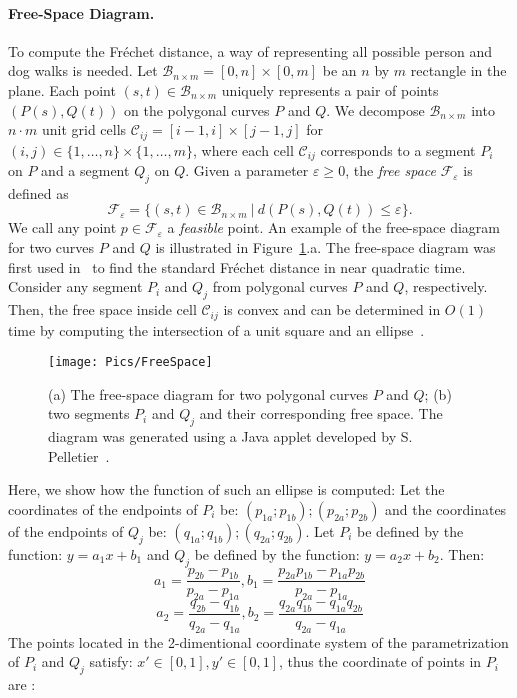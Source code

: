 \documentclass[12pt]{dalthesis}
\newcommand{\lee}{\leqslant}
\newcommand{\gee}{\geqslant}
\newcommand{\set}[1]{{\{ #1 \}}}
\newcommand{\eps}{\varepsilon}
\newcommand{\CF}{{\mathscr F}}
\newcommand{\CB}{{\mathscr B}}
\newcommand{\CC}{{\mathscr C}}
\newcommand{\Frechet}{Fr\'echet }
\newcommand{\cell}[1]{{\CC_{#1}}}
\newcommand{\BNM}{\CB_{n \times m}}
\newcommand{\Feps}{\CF_\eps}
\begin{document}
\paragraph{Free-Space Diagram.}
To compute the \Frechet distance, a way of representing all possible 
person and dog walks is needed.
Let $\BNM = [0,n] \times [0,m]$ be an $n$ by $m$ rectangle  in the plane.
Each point $(s,t) \in \BNM$ uniquely represents a pair of points
$(P(s),Q(t))$ on the polygonal curves $P$ and $Q$.
We decompose $\BNM$ into
$n\cdot m$ unit grid cells $\cell{ij} = [i-1,i] \times [j-1,j]$
for $(i,j) \in \set{1, \ldots, n} \times \set{1, \ldots, m}$,
where each cell $\cell{ij}$ corresponds to
a segment $P_i$ on $P$ and a segment $Q_j$ on $Q$.
Given a parameter $\eps \gee 0$,
the {\em free space\/} $\Feps$ is defined as
\[
	\Feps = \set{(s,t) \in \BNM \ | \ d(P(s),Q(t)) \lee \eps }.
\]
We call any point $p \in \Feps$ a {\em feasible\/} point.
An example of the free-space diagram for two curves $P$ and $Q$ 
is illustrated in Figure~\ref{fig:diagram}.a.
The free-space diagram was first used in~\cite{AltG95}
to find the standard \Frechet distance in near quadratic time.
Consider any segment $P_i$ and $Q_j$ from polygonal curves $P$ and $Q$, 
respectively. Then, the free space inside cell $\cell{ij}$ is convex 
and can be determined in $O(1)$ time by computing the intersection of a unit square and an ellipse~\cite{AltG95}.


\begin{figure}[h]
	\centering
	\texttt{[image: Pics/FreeSpace]}
	\caption{ (a) The free-space diagram for two polygonal curves $P$ and $Q$;
	(b) two segments $P_i$ and $Q_j$ and their corresponding free space.
	The diagram was generated using a Java applet developed by S. Pelletier~\cite{FDApplet}.}
	\label{fig:diagram}
\end{figure}
 





	Here, we show how the function of such an ellipse is computed:
	Let the coordinates of the endpoints of $P_i$ be: $(p_{1a}; p_{1b}); (p_{2a}; p_{2b})$
	and the coordinates of
	the endpoints of $Q_j$ be: $(q_{1a}; q_{1b}); (q_{2a}; q_{2b})$. 
	Let $P_i$ be defined by the function: $y = a_1x + b_1$
	and $Q_j$ be defined by the function: $y = a_2x + b_2$. Then: 
	\begin{displaymath}
	a_1 = \frac{ p_{2b} - p_{1b} }{ p_{2a} - p_{1a} }, b_1 = \frac{p_{2a}p_{1b} - p_{1a}p_{2b}}		{p_{2a} - p_{1a}}
	\end{displaymath}
	\begin{displaymath}
	a_2 = \frac{ q_{2b} - q_{1b} }{ q_{2a} - q_{1a} }, b_2 = \frac{q_{2a}q_{1b} - q_{1a}q_{2b}}{q_{2a} - q_{1a}}
	\end{displaymath}
	The points located in the 2-dimentional coordinate system of the parametrization of $P_i$
	and $Q_j$ satisfy: $x' \in [0,1], y' \in [0,1]$, thus the coordinate of points in $P_i$ are :
\end{document}

